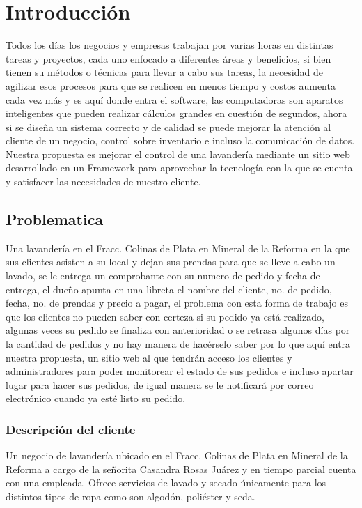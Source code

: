 \section{Introducción}
Todos los días los negocios y empresas trabajan por varias horas en distintas tareas y proyectos, cada uno enfocado a diferentes áreas y beneficios, si bien tienen su métodos o técnicas para llevar a cabo sus tareas, la necesidad de agilizar esos procesos para que se realicen en menos tiempo y costos aumenta cada vez más y es aquí donde entra el software, las computadoras son aparatos inteligentes que pueden realizar cálculos grandes en cuestión de segundos, ahora si se diseña un sistema correcto y de calidad se puede mejorar la atención al cliente de un negocio, control sobre inventario e incluso la comunicación de datos. Nuestra propuesta es mejorar el control de una lavandería mediante un sitio web desarrollado en un Framework para aprovechar la tecnología con la que se cuenta y satisfacer las necesidades de nuestro cliente. 




\subsection{Problematica}
Una lavandería en el Fracc. Colinas de Plata en Mineral de la Reforma en la que sus clientes asisten a su local y dejan sus prendas para que se lleve a cabo un lavado, se le entrega un comprobante con su numero de pedido y fecha de entrega, el dueño apunta en una libreta el nombre del cliente, no. de pedido, fecha, no. de prendas y precio a pagar, el problema con esta forma de trabajo es que los clientes no pueden saber con certeza si su pedido ya está realizado, algunas veces su pedido se finaliza con anterioridad o se retrasa algunos días por la cantidad de pedidos y no hay manera de hacérselo saber por lo que aquí entra nuestra propuesta, un sitio web al que tendrán acceso los clientes y administradores para poder monitorear el estado de sus pedidos e incluso apartar lugar para hacer sus pedidos, de igual manera se le notificará por correo electrónico cuando ya esté listo su pedido.
\subsubsection{Descripción del cliente}
Un negocio de lavandería ubicado en el Fracc. Colinas de Plata en Mineral de la Reforma a cargo de la señorita Casandra Rosas Juárez y en tiempo parcial cuenta con una empleada. Ofrece servicios de lavado y secado únicamente para los distintos tipos de ropa como son algodón, poliéster y seda.

